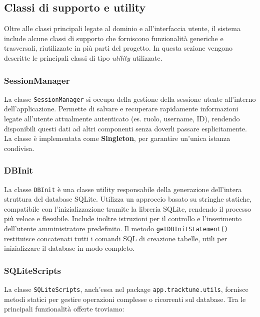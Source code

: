 \documentclass[a4paper]{article}
\begin{document}
\subsection{Classi di supporto e utility}
Oltre alle classi principali legate al dominio e all’interfaccia utente, il sistema include alcune classi di supporto che forniscono funzionalità generiche e trasversali, riutilizzate in più parti del progetto. In questa sezione vengono descritte le principali classi di tipo \textit{utility} utilizzate.

\subsubsection{SessionManager}
La classe \texttt{SessionManager} si occupa della gestione della sessione utente all’interno dell’applicazione. Permette di salvare e recuperare rapidamente informazioni legate all’utente attualmente autenticato (es. ruolo, username, ID), rendendo disponibili questi dati ad altri componenti senza doverli passare esplicitamente.
La classe è implementata come \textbf{Singleton}, per garantire un’unica istanza condivisa.

\subsubsection{DBInit}
La classe \texttt{DBInit} è una classe utility responsabile della generazione dell'intera struttura del database SQLite.
Utilizza un approccio basato su stringhe statiche, compatibile con l'inizializzazione tramite la libreria SQLite, rendendo il processo più veloce e flessibile.
Include inoltre istruzioni per il controllo e l'inserimento dell'utente amministratore predefinito.
Il metodo \texttt{getDBInitStatement()} restituisce concatenati tutti i comandi SQL di creazione tabelle, utili per inizializzare il database in modo completo.

\subsubsection{SQLiteScripts}

La classe \texttt{SQLiteScripts}, anch'essa nel package \texttt{app.tracktune.utils}, fornisce metodi statici per gestire operazioni complesse o ricorrenti sul database.
Tra le principali funzionalità offerte troviamo:
\end{document}
